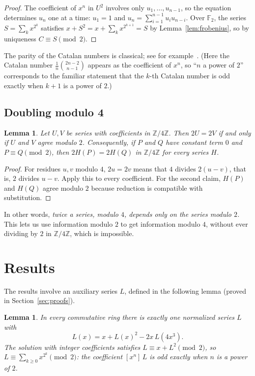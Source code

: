 \documentclass[11pt,a4paper]{article}
\newtheorem{lemma}[theorem]{Lemma}
\theoremstyle{definition}
\theoremstyle{remark}
\newcommand{\Z}{\mathbb{Z}}
\newcommand{\F}{\mathbb{F}}
\newcommand{\coeff}[2]{[x^{#1}]\,#2}
\begin{document}
\begin{proof}
The coefficient of $x^n$ in $U^2$ involves only $u_1,\dots,u_{n-1}$, so the equation determines $u_n$ one at a time:
$u_1=1$ and $u_n=\sum_{i=1}^{n-1}u_iu_{n-i}$. Over $\F_2$, the series $S=\sum_kx^{2^k}$ satisfies
$x+S^2=x+\sum_kx^{2^{k+1}}=S$ by Lemma~\ref{lem:frobenius}, so by uniqueness $C\equiv S\pmod2$.
\end{proof}
The parity of the Catalan numbers is classical; see for example~\cite{deutschsagan}. (Here the Catalan number
$\frac1{n}\binom{2n-2}{n-1}$ appears as the coefficient of $x^n$, so ``$n$ a power of $2$'' corresponds to the familiar
statement that the $k$-th Catalan number is odd exactly when $k+1$ is a power of $2$.)

\subsection{Doubling modulo 4}
\begin{lemma}\label{lem:double}
Let $U,V$ be series with coefficients in $\Z/4\Z$. Then $2U=2V$ if and only if $U$ and $V$ agree modulo $2$.
Consequently, if $P$ and $Q$ have constant term $0$ and $P\equiv Q\pmod 2$, then $2H(P)=2H(Q)$ in $\Z/4\Z$ for every
series $H$.
\end{lemma}

\begin{proof}
For residues $u,v$ modulo $4$, $2u=2v$ means that $4$ divides $2(u-v)$, that is, $2$ divides $u-v$. Apply this to
every coefficient. For the second claim, $H(P)$ and $H(Q)$ agree modulo $2$ because reduction is compatible with
substitution.
\end{proof}
In other words, \emph{twice a series, modulo $4$, depends only on the series modulo $2$.} This lets us use information modulo
$2$ to get information modulo $4$, without ever dividing by $2$ in $\Z/4\Z$, which is impossible.

\section{Results}\label{sec:results}

The results involve an auxiliary series $L$, defined in the following lemma (proved in Section~\ref{sec:proofs}).

\begin{lemma}\label{lem:L}
In every commutative ring there is exactly one normalized series $L$ with
\[
L(x)=x+L(x)^2-2x\,L(4x^3).
\]
The solution with integer coefficients satisfies $L\equiv x+L^2\pmod 2$, so $L\equiv\sum_{k\ge0}x^{2^k}\pmod 2$:
the coefficient $\coeff{n}{L}$ is odd exactly when $n$ is a power of $2$.
\end{lemma}
\end{document}
